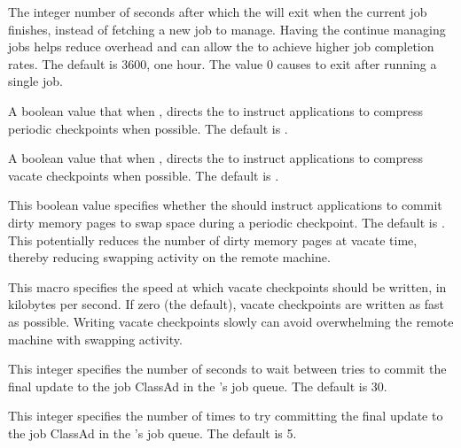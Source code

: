\begin{description}
\label{param:ShadowWorklife}
\item[\Macro{SHADOW\_WORKLIFE}]
  The integer number of seconds after which the  will exit
  when the current job finishes, instead of fetching a new job to
  manage.  Having the  continue managing jobs helps
  reduce overhead and can allow the  to achieve higher
  job completion rates.  The default is 3600, one hour.  The value 0
  causes  to exit after running a single job.

\label{param:CompressPeriodicCkpt}
\item[\Macro{COMPRESS\_PERIODIC\_CKPT}]
  A boolean value that when , directs the 
  to instruct applications to compress periodic checkpoints when possible.
  The default is .

\label{param:CompressVacateCkpt}
\item[\Macro{COMPRESS\_VACATE\_CKPT}]
  A boolean value that when , directs the 
  to instruct applications to compress vacate checkpoints when possible.
  The default is .

\label{param:PeriodicMemorySync}
\item[\Macro{PERIODIC\_MEMORY\_SYNC}]
  This boolean value specifies whether the  should instruct
  applications to commit dirty memory pages to swap space during a
  periodic checkpoint.  The default is .  This potentially
  reduces the number of dirty memory pages at vacate time, thereby
  reducing swapping activity on the remote machine.

\label{param:SlowCkptSpeed}
\item[\Macro{SLOW\_CKPT\_SPEED}]
  This macro specifies the speed at which vacate checkpoints should be
  written, in kilobytes per second.  If zero (the default), vacate
  checkpoints are written as fast as possible.  Writing vacate
  checkpoints slowly can avoid overwhelming the remote machine with
  swapping activity.

\label{param:ShadowJobCleanupRetryDelay}
\item[\Macro{SHADOW\_JOB\_CLEANUP\_RETRY\_DELAY}]
  This integer specifies the number of seconds to wait between tries
  to commit the final update to the job ClassAd in the 's
  job queue.  The default is 30.

\label{param:ShadowMaxJobCleanupRetries}
\item[\Macro{SHADOW\_MAX\_JOB\_CLEANUP\_RETRIES}]
  This integer specifies the number of times to try committing
  the final update to the job ClassAd in the 's
  job queue.  The default is 5.


\end{description}
